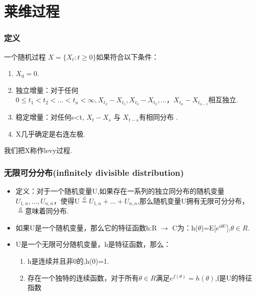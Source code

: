 \section{莱维过程}

\begin{frame}
\frametitle{定义}
一个随机过程 ${X=\{X_{t}:t\geq 0\}}$如果符合以下条件： 
\begin{enumerate}[(1)]
\item $X_{0}=0$.
\item 独立增量：对于任何$0\leq t_{1} < t_{2} < \dots < t_{n} < \infty ,X_{t_2}-X_{t_1},X_{t_3}-X_{t_2},\dots，X_{t_n}-X_{t_{n-1}}$相互独立.
\item 稳定增量：对任何s<t, $X_{t}-X_{s}$ 与 $X_{t-s}$有相同分布 .  
\item X几乎确定是右连左极.
\end{enumerate}
我们把X称作levy过程.
\end{frame}

\begin{frame}
\frametitle{无限可分分布(infinitely divisible distribution)}
\begin{itemize}
\item 定义：对于一个随机变量U,如果存在一系列的独立同分布的随机变量$U_{1,n},\dots,U_{n,n}$，使得U$\overset{\text{d}}{=}U_{1,n}+\dots+U_{n,n}$,那么随机变量U拥有无限可分分布，$\overset{\text{d}}{=}$意味着同分布.
\item 如果U是一个随机变量，那么它的特征函数h:R $\to$ C为：h($\theta$)=E[$e^{i\theta U}$],$\theta \in R$.
\item U是一个无限可分随机变量，h是特征函数，那么：
\begin{enumerate}[(1)]
\item h是连续并且非0的,h(0)=1.
\item 存在一个独特的连续函数，对于所有$\theta \in R$满足$e^{f(\theta)}=h(\theta)$,f是U的特征指数
\end{enumerate}
\end{itemize}
\end{frame}

